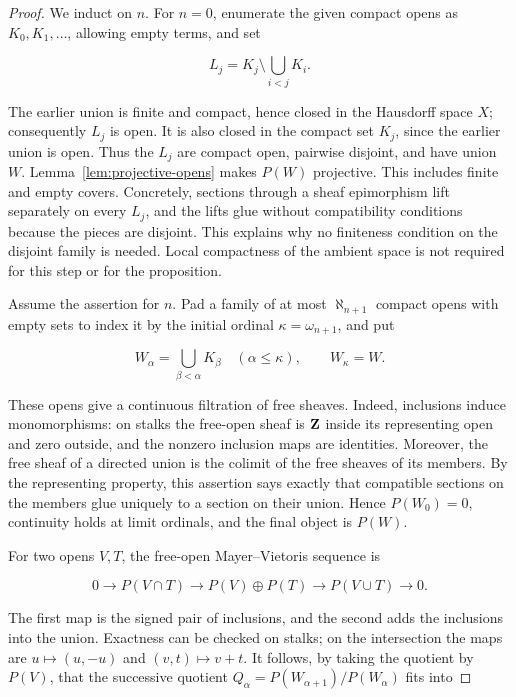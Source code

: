 \begin{proof}
We induct on \(n\). For \(n=0\), enumerate the given compact opens as
\(K_0,K_1,\ldots\), allowing empty terms, and set

\[
L_j=K_j\setminus\bigcup_{i<j}K_i.
\]

The earlier union is finite and compact, hence closed in the Hausdorff
space \(X\); consequently \(L_j\) is open. It is also closed in the
compact set \(K_j\), since the earlier union is open. Thus the \(L_j\)
are compact open, pairwise disjoint, and have union \(W\).
Lemma~\ref{lem:projective-opens} makes \(P(W)\) projective. This includes
finite and empty covers.
Concretely, sections through a sheaf epimorphism lift separately on every
\(L_j\), and the lifts glue without compatibility conditions because the
pieces are disjoint. This explains why no finiteness condition on the
disjoint family is needed. Local compactness of the ambient space is not
required for this step or for the proposition.

Assume the assertion for \(n\). Pad a family of at most
\(\aleph_{n+1}\) compact opens with empty sets to index it by the initial
ordinal \(\kappa=\omega_{n+1}\), and put

\[
W_\alpha=\bigcup_{\beta<\alpha}K_\beta
\quad(\alpha\leq\kappa),
\qquad W_\kappa=W.
\]

These opens give a continuous filtration of free sheaves. Indeed,
inclusions induce monomorphisms: on stalks the free-open sheaf is \(\mathbf Z\)
inside its representing open and zero outside, and the nonzero inclusion
maps are identities. Moreover, the free sheaf of a directed union is the
colimit of the free sheaves of its members. By the representing property,
this assertion says exactly that compatible sections on the members glue
uniquely to a section on their union. Hence \(P(W_0)=0\), continuity holds
at limit ordinals, and the final object is \(P(W)\).

For two opens \(V,T\), the free-open Mayer--Vietoris sequence is

\[
0\longrightarrow P(V\cap T)
\longrightarrow P(V)\oplus P(T)
\longrightarrow P(V\cup T)\longrightarrow0.
\]

The first map is the signed pair of inclusions, and the second adds the
inclusions into the union. Exactness can be checked on stalks; on the
intersection the maps are \(u\mapsto(u,-u)\) and \((v,t)\mapsto v+t\).
It follows, by taking the quotient by \(P(V)\), that the successive
quotient \(Q_\alpha=P(W_{\alpha+1})/P(W_\alpha)\) fits into


\end{proof}
